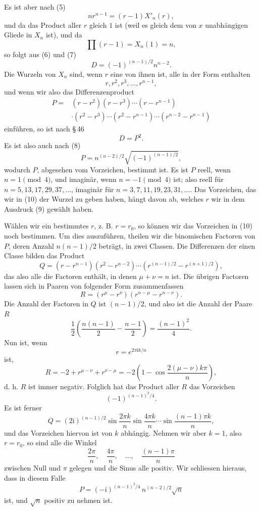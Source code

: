 \documentclass[11pt]{article}
\providecommand{\ii}{\mathrm{i}}
\begin{document}
Es ist aber nach (5)
\[
\tag{7}        nr^{n-1}=(r-1)X'_n(r),
\]
und da das Product aller $r$ gleich $1$ ist (weil es gleich dem von $x$ unabhängigen Gliede in $X_n$ ist), und da
\[
        \prod(r-1)=X_n(1)=n,
\]
so folgt aus (6) und (7)
\[
\tag{8}        D=(-1)^{(n-1)/2} n^{n-2}.
\]
Die Wurzeln von $X_n$ sind, wenn $r$ eine von ihnen ist, alle in der Form enthalten
\[
        r,r^2,r^3,\ldots,r^{n-1},
\]
und wenn wir also das Differenzenproduct
\[
\tag{9}\begin{aligned}
P={}&(r-r^2)(r-r^3)\cdots(r-r^{n-1})\\
&\cdot(r^2-r^3)\cdots(r^2-r^{n-1})\cdots(r^{n-2}-r^{n-1})
\end{aligned}
\]
einführen, so ist nach \S\,46
\[
        D=P^2.
\]
Es ist also auch nach (8)
\[
\tag{10}       P=n^{(n-2)/2}\sqrt{(-1)^{(n-1)/2}},
\]
wodurch $P$, abgesehen vom Vorzeichen, bestimmt ist. Es ist $P$ reell, wenn $n=1\pmod4$, und imaginär, wenn $n=-1\pmod4$ ist; also reell für $n=5,13,17,29,37,\ldots$, imaginär für $n=3,7,11,19,23,31,\ldots$. Das Vorzeichen, das wir in (10) der Wurzel zu geben haben, hängt davon ab, welches $r$ wir in dem Ausdruck (9) gewählt haben.

Wählen wir ein bestimmtes $r$, z. B. $r=r_0$, so können wir das Vorzeichen in (10) noch bestimmen. Um dies auszuführen, theilen wir die binomischen Factoren von $P$, deren Anzahl $n(n-1)/2$ beträgt, in zwei Classen. Die Differenzen der einen Classe bilden das Product
\[
\tag{11}       Q=(r-r^{n-1})(r^2-r^{n-2})\cdots\left(r^{(n-1)/2}-r^{(n+1)/2}\right),
\]
das also alle die Factoren enthält, in denen $\mu+\nu=n$ ist. Die übrigen Factoren lassen sich in Paaren von folgender Form zusammenfassen
\[
\tag{12}       R=(r^\mu-r^\nu)(r^{n-\mu}-r^{n-\nu}).
\]
Die Anzahl der Factoren in $Q$ ist $(n-1)/2$, und also ist die Anzahl der Paare $R$
\[
        \frac12\left(\frac{n(n-1)}2-\frac{n-1}2\right)=\frac{(n-1)^2}{4}.
\]
Nun ist, wenn
\[
        r=e^{2\pi \ii k/n}
\]
ist,
\[
        R=-2+r^{\mu-\nu}+r^{\nu-\mu}=-2\left(1-\cos\frac{2(\mu-\nu)k\pi}{n}\right),
\]
d. h. $R$ ist immer negativ. Folglich hat das Product aller $R$ das Vorzeichen
\[
        (-1)^{(n-1)^2/4}.
\]
Es ist ferner
\[
\tag{13}       Q=(2\ii)^{(n-1)/2}\sin\frac{2\pi k}{n}\sin\frac{4\pi k}{n}\cdots\sin\frac{(n-1)\pi k}{n},
\]
und das Vorzeichen hiervon ist von $k$ abhängig. Nehmen wir aber $k=1$, also $r=r_0$, so sind alle die Winkel
\[
        \frac{2\pi}{n},\quad \frac{4\pi}{n},\quad\ldots,\quad \frac{(n-1)\pi}{n}
\]
zwischen Null und $\pi$ gelegen und die Sinus alle positiv. Wir schliessen hieraus, dass in diesem Falle
\[
\tag{14}       P=(-\ii)^{(n-1)^2/4}\, n^{(n-2)/2}\sqrt n
\]
ist, und $\sqrt n$ positiv zu nehmen ist.
\end{document}
